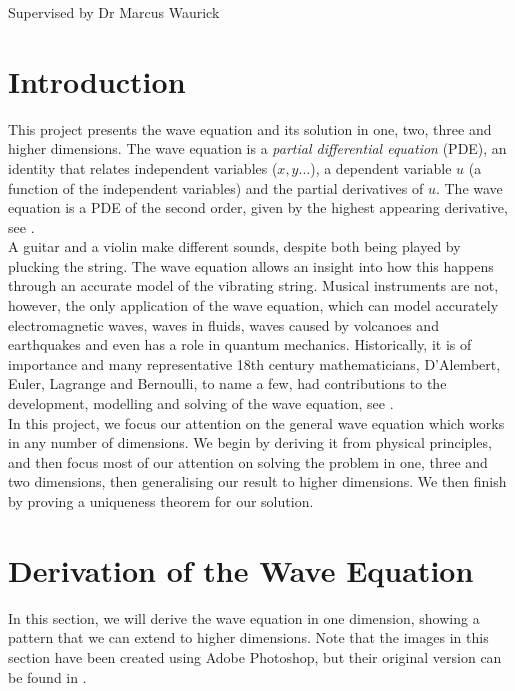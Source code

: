 \documentclass[a4paper, 12pt]{article}
\numberwithin{equation}{section}
\begin{document}
    \vspace*{5cm}
    Supervised by Dr Marcus Waurick
    \newpage
    \normalsize
    \tableofcontents
    \newpage

\section{Introduction}
This project presents the wave equation and its solution in one, two, three and
higher dimensions. The wave equation is a \emph{partial differential equation} (PDE),
an identity that relates independent variables ($x, y...$), a dependent variable
$u$ (a function of the independent variables) and the partial derivatives of
$u$. The wave equation is a PDE of the second order, given by the highest
appearing derivative, see \cite[Ch. 1, \S A]{Fol}. \\

A guitar and a violin make different sounds, despite both being played by
plucking the string. The wave equation allows an insight into how this happens
through an accurate model of the vibrating string. Musical instruments are not,
however, the  only application of the wave equation, which can model accurately
electromagnetic waves, waves in fluids, waves caused by volcanoes and
earthquakes and even has a role in quantum mechanics. Historically, it is of
importance and many representative 18th century mathematicians, D'Alembert,
Euler, Lagrange and Bernoulli, to name a few, had contributions to the
development, modelling and solving of the wave equation, see \cite{Coc}. \\

In this project, we focus our attention on the general wave equation which works
in any number of dimensions. We begin by deriving it from physical principles,
and then focus most of our attention on solving the problem in one, three and
two dimensions, then generalising our result to higher dimensions. We then finish by
proving a uniqueness theorem for our solution.

\section{Derivation of the Wave Equation}
In this section, we will derive the wave equation in one dimension, showing a
pattern that we can extend to higher dimensions. Note that the images in
this section have been created using Adobe Photoshop, but their original
version can be found in \cite[Ch. 12.2]{Kr}.
\end{document}

